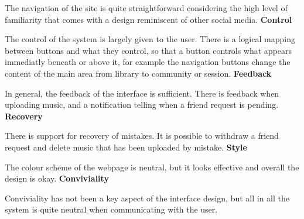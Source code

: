 \vspace{10pt}The navigation of the site is quite straightforward considering the high level of familiarity that comes with a design reminiscent of other social media.
\vspace{10pt}
\textbf{Control}

\vspace{10pt}The control of the system is largely given to the user. There is a logical mapping between buttons and what they control, so that a button controls what appears immediatly beneath or above it, for example the navigation buttons change the content of the main area from library to community or session.
\vspace{10pt}
\textbf{Feedback}

\vspace{10pt}In general, the feedback of the interface is sufficient. There is feedback when uploading music, and a notification telling when a friend request is pending.
\vspace{10pt}
\textbf{Recovery}

\vspace{10pt}There is support for recovery of mistakes. It is possible to withdraw a friend request and delete music that has been uploaded by mistake. 
\vspace{10pt}
\textbf{Style}

\vspace{10pt}The colour scheme of the webpage is neutral, but it looks effective and overall the design is okay.
\vspace{10pt}
\textbf{Conviviality}

\vspace{10pt}Conviviality has not been a key aspect of the interface design, but all in all the system is quite neutral when communicating with the user.
